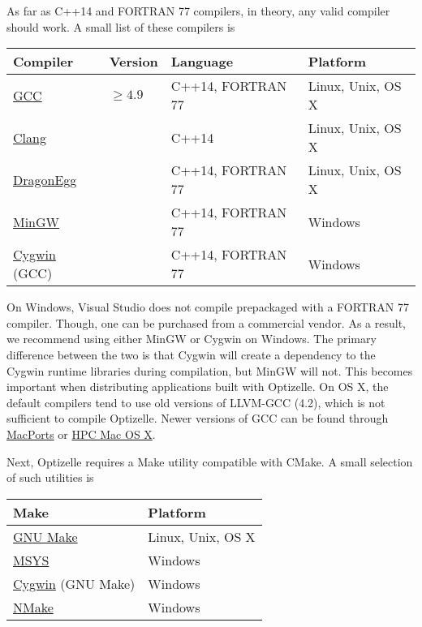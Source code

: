 \documentclass{report}
\begin{document}
        As far as C++14 and FORTRAN 77 compilers, in theory, any valid compiler should work.  A small list of these compilers is
\label{tbl:compilers}
\begin{center}\begin{tabular}{|l|l|l|l|}\hline
{\bf Compiler} & {\bf Version} & {\bf Language} & {\bf Platform}\\\hline
\href{http://gcc.gnu.org}{GCC} & $\geq 4.9$ & C++14, FORTRAN 77 & Linux, Unix, OS X \\\hline
\href{http://clang.llvm.org}{Clang} & & C++14 & Linux, Unix, OS X \\\hline
\href{http://dragonegg.llvm.org}{DragonEgg} & & C++14, FORTRAN 77 & Linux, Unix, OS X \\\hline
\href{http://www.mingw.org}{MinGW} & & C++14, FORTRAN 77 & Windows \\\hline
\href{http://www.cygwin.com}{Cygwin} (GCC) & & C++14, FORTRAN 77 & Windows \\\hline
\end{tabular}\end{center}
On Windows, Visual Studio does not compile prepackaged with a FORTRAN 77 compiler.  Though, one can be purchased from a commercial vendor.  As a result, we recommend using either MinGW or Cygwin on Windows.  The primary difference between the two is that Cygwin will create a dependency to the Cygwin runtime libraries during compilation, but MinGW will not.  This becomes important when distributing applications built with Optizelle.  On OS X, the default compilers tend to use old versions of LLVM-GCC (4.2), which is not sufficient to compile Optizelle.  Newer versions of GCC can be found through \href{https://www.macports.org}{MacPorts} or \href{http://hpc.sourceforge.net}{HPC Mac OS X}.

       Next, Optizelle requires a Make utility compatible with CMake.  A small selection of such utilities is 
\label{tbl:make}
\begin{center}\begin{tabular}{|l|l|}\hline
{\bf Make} & {\bf Platform}\\\hline
\href{https://www.gnu.org/software/make}{GNU Make} & Linux, Unix, OS X \\\hline
\href{http://www.mingw.org}{MSYS} & Windows\\\hline
\href{http://www.cygwin.com}{Cygwin} (GNU Make) & Windows \\\hline
\href{http://msdn.microsoft.com/en-us/vstudio}{NMake} & Windows \\\hline
\end{tabular}\end{center}
\end{document}

